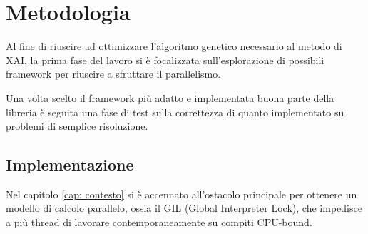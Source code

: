 \chapter{Metodologia}

Al fine di riuscire ad ottimizzare l'algoritmo genetico necessario al metodo di
XAI, la prima fase del lavoro si è focalizzata sull'esplorazione di possibili
framework per riuscire a sfruttare il parallelismo.

Una volta scelto il framework più adatto e implementata buona parte della
libreria è seguita una fase di test sulla correttezza di quanto implementato
su problemi di semplice risoluzione.

\section{Implementazione}

Nel capitolo \ref{cap: contesto} si è accennato all'ostacolo principale per
ottenere un modello di calcolo parallelo, ossia il GIL (Global Interpreter
Lock), che impedisce a più thread di lavorare contemporaneamente su compiti
CPU-bound.